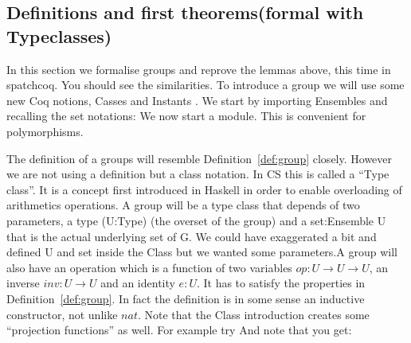 \subsection{Definitions and first theorems(formal with Typeclasses)}

In this section we formalise groups and reprove the lemmas above, this time in spatchcoq. You should see the similarities.
To introduce  a group we will use some new Coq notions, Casses and  Instants .  
We start by importing Ensembles and  recalling the set notations:
We now start a module. This is convenient for polymorphisms. 

The definition of a groups will resemble Definition~\ref{def:group} closely. However we are not using a definition but a class notation. 
In CS this  is called  a ``Type class''. It is a concept first introduced in Haskell in order to enable overloading of arithmetics  operations. A group will be a type class that depends of two parameters, a type (U:Type) (the overset of the group) and a set:Ensemble U that is the actual underlying set of G. We could have exaggerated a bit and defined U and set inside the Class but we wanted some parameters.A group will also have an operation  which is a function of two variables $op: U\rightarrow U \rightarrow U$, an inverse $inv:U \rightarrow U$ and an identity $e:U$. It has to satisfy the properties in Definition~\ref{def:group}. In fact the definition is in some sense an inductive constructor, not unlike $nat$. Note that the Class introduction creates some ``projection functions'' as well. For example try
 And note that you get:

